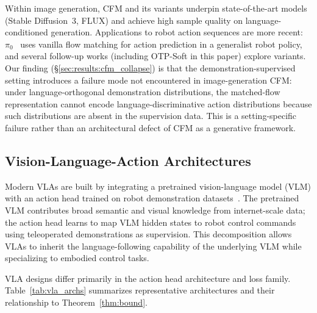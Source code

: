 Within image generation, CFM and its variants underpin state-of-the-art models (Stable
Diffusion~3, FLUX) and achieve high sample quality on language-conditioned generation.
Applications to robot action sequences are more recent: $\pi_0$~\cite{black2024pi0} uses
vanilla flow matching for action prediction in a generalist robot policy, and several
follow-up works (including OTP-Soft in this paper) explore variants. Our finding
(\S\ref{sec:results:cfm_collapse}) is that the demonstration-supervised setting introduces
a failure mode not encountered in image-generation CFM: under language-orthogonal
demonstration distributions, the matched-flow representation cannot encode
language-discriminative action distributions because such distributions are absent in the
supervision data. This is a setting-specific failure rather than an architectural defect
of CFM as a generative framework.

\subsection{Vision-Language-Action Architectures}
\label{sec:related:vla}

Modern VLAs are built by integrating a pretrained vision-language model (VLM) with an
action head trained on robot demonstration datasets~\cite{brohan2023rt2, kim2024openvla}.
The pretrained VLM contributes broad semantic and visual knowledge from internet-scale
data; the action head learns to map VLM hidden states to robot control commands using
teleoperated demonstrations as supervision. This decomposition allows VLAs to inherit the
language-following capability of the underlying VLM while specializing to embodied control
tasks.

VLA designs differ primarily in the action head architecture and loss family.
Table~\ref{tab:vla_archs} summarizes representative architectures and their relationship
to Theorem~\ref{thm:bound}.


